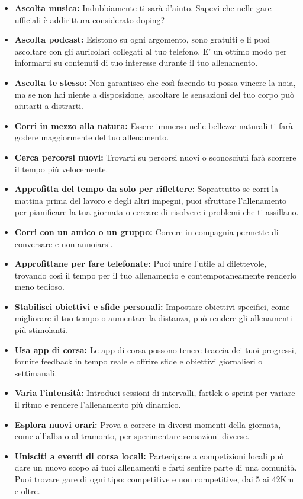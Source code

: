 \begin{itemize}
    \item \textbf{Ascolta musica:}
    Indubbiamente ti sarà d'aiuto.
    Sapevi che nelle gare ufficiali è addirittura considerato doping?
    \item \textbf{Ascolta podcast:}
    Esistono su ogni argomento, sono gratuiti e li puoi
    ascoltare con gli auricolari collegati al tuo telefono.
    E' un ottimo modo per informarti su contenuti di tuo interesse
    durante il tuo allenamento.
    \item \textbf{Ascolta te stesso:}
    Non garantisco che così facendo
    tu possa vincere la noia, ma se non hai niente a disposizione,
    ascoltare le sensazioni del tuo corpo può aiutarti a distrarti.
    \item \textbf{Corri in mezzo alla natura:}
    Essere immerso
    nelle bellezze naturali ti farà godere maggiormente del tuo allenamento.
    \item \textbf{Cerca percorsi nuovi:}
    Trovarti su percorsi nuovi o sconosciuti
    farà scorrere il tempo più velocemente.
    \item \textbf{Approfitta del tempo da solo per riflettere:}
    Soprattutto se corri la mattina prima del lavoro e degli altri impegni,
    puoi sfruttare l'allenamento per pianificare la tua giornata
    o cercare di risolvere i problemi che ti assillano.
    \item \textbf{Corri con un amico o un gruppo:}
    Correre in compagnia permette di conversare e
    non annoiarsi.
    \item \textbf{Approfittane per fare telefonate:}
    Puoi unire l'utile al dilettevole, trovando così il tempo per il tuo allenamento
    e contemporaneamente renderlo meno tedioso.
    \item \textbf{Stabilisci obiettivi e sfide personali:}
    Impostare obiettivi specifici, come migliorare il tuo tempo
    o aumentare la distanza, può rendere gli allenamenti più stimolanti.
    \item \textbf{Usa app di corsa:}
    Le app di corsa possono tenere traccia dei tuoi progressi,
    fornire feedback in tempo reale e offrire sfide e obiettivi giornalieri o settimanali.
    \item \textbf{Varia l’intensità:}
    Introduci sessioni di intervalli, fartlek o sprint per variare
    il ritmo e rendere l'allenamento più dinamico.
    \item \textbf{Esplora nuovi orari:}
    Prova a correre in diversi momenti della giornata, come all'alba o al tramonto,
    per sperimentare sensazioni diverse.
    \item \textbf{Unisciti a eventi di corsa locali:}
    Partecipare a competizioni locali
    può dare un nuovo scopo ai tuoi allenamenti
    e farti sentire parte di una comunità.
    Puoi trovare gare di ogni tipo: competitive e non competitive,
    dai 5 ai 42Km e oltre.
\end{itemize}

